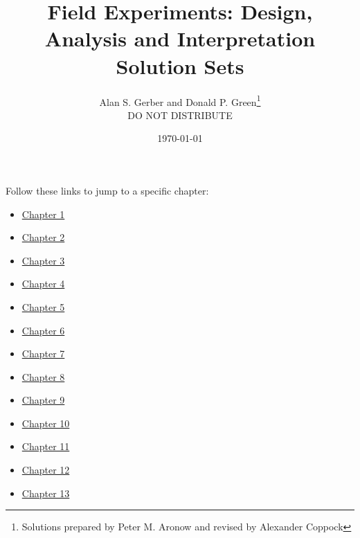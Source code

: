 \documentclass[11pt,notitlepage]{article}\usepackage[]{graphicx}\usepackage[]{color}
\begin{document}
\title{Field Experiments: Design, Analysis and Interpretation \\
Solution Sets}
\author{Alan S. Gerber and Donald P. Green\footnote{Solutions prepared by Peter M. Aronow and revised by Alexander Coppock}\\
DO NOT DISTRIBUTE}
\date{\today}

\maketitle
Follow these links to jump to a specific chapter:
\begin{itemize}
\item \hyperlink{page.2}{Chapter 1}
\item \hyperlink{page.5}{Chapter 2}
\item \hyperlink{page.15}{Chapter 3}
\item \hyperlink{page.32}{Chapter 4}
\item \hyperlink{page.55}{Chapter 5}
\item \hyperlink{page.71}{Chapter 6}
\item \hyperlink{page.81}{Chapter 7}
\item \hyperlink{page.91}{Chapter 8}
\item \hyperlink{page.105}{Chapter 9}
\item \hyperlink{page.120}{Chapter 10}
\item \hyperlink{page.134}{Chapter 11}
\item \hyperlink{page.148}{Chapter 12}
\item \hyperlink{page.170}{Chapter 13}
\end{itemize}

















\end{document}
